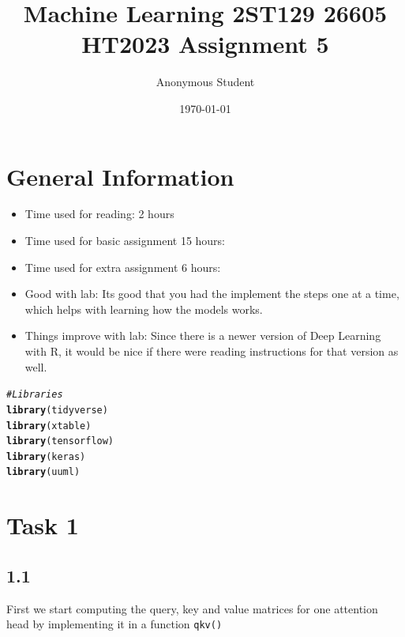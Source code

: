 \documentclass[10pt, a4paper, english]{article}\usepackage[]{graphicx}\usepackage[dvipsnames]{xcolor}
\title{Machine Learning 2ST129 26605 HT2023
 Assignment 5}
\author{Anonymous Student}
\date{\today}
\makeatletter
\newcommand{\hlcom}[1]{\textcolor[rgb]{0.678,0.584,0.686}{\textit{#1}}}%
\newcommand{\hlstd}[1]{\textcolor[rgb]{0.345,0.345,0.345}{#1}}%
\newcommand{\hlkwd}[1]{\textcolor[rgb]{0.737,0.353,0.396}{\textbf{#1}}}%
\newenvironment{kframe}{%
 \def\at@end@of@kframe{}%
 \ifinner\ifhmode%
  \def\at@end@of@kframe{\end{minipage}}%
  \begin{minipage}{\columnwidth}%
 \fi\fi%
 \def\FrameCommand##1{\hskip\@totalleftmargin \hskip-\fboxsep
 \colorbox{shadecolor}{##1}\hskip-\fboxsep
     \hskip-\linewidth \hskip-\@totalleftmargin \hskip\columnwidth}%
 \MakeFramed {\advance\hsize-\width
   \@totalleftmargin\z@ \linewidth\hsize
   \@setminipage}}%
 {\par\unskip\endMakeFramed%
 \at@end@of@kframe}
\newenvironment{knitrout}{}{} %
\makeatother
\begin{document}
\maketitle
\newpage
\tableofcontents
\newpage

\section*{General Information}
\begin{itemize}
\item Time used for reading: 2 hours
\item Time used for basic assignment 15 hours:
\item Time used for extra assignment 6 hours: 
\item Good with lab: Its good that you had the implement the steps one at a time, which helps with learning how the models works.
\item Things improve with lab: Since there is a newer version of Deep Learning with R, it would be nice if there were reading instructions for that version as well. 
\end{itemize}
\newpage




\begin{knitrout}
\color{fgcolor}\begin{kframe}
\begin{alltt}
\hlcom{#Libraries}
 \hlkwd{library}\hlstd{(tidyverse)}
 \hlkwd{library}\hlstd{(xtable)}
 \hlkwd{library}\hlstd{(tensorflow)}
 \hlkwd{library}\hlstd{(keras)}
 \hlkwd{library}\hlstd{(uuml)}
\end{alltt}
\end{kframe}
\end{knitrout}
\section{Task 1}
\subsection{1.1}
First we start computing the query, key and value matrices for one attention head by implementing it in a function \texttt{qkv()}
\end{document}
